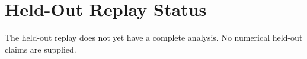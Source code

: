 \section{Held-Out Replay Status}
The held-out replay does not yet have a complete analysis. No numerical held-out claims are supplied.
